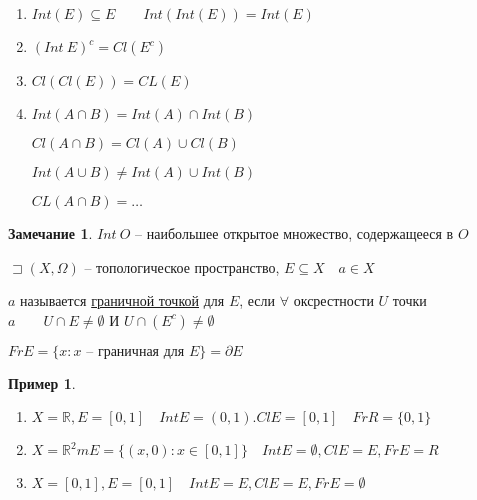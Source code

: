 \documentclass{book}
\newcommand\R{\ensuremath{\mathbb{R}}}
\renewcommand\O{\ensuremath{\emptyset}}
\theoremstyle{definition}
\newtheorem*{note}{Замечание}
\newtheorem*{example}{Пример}
\begin{document}
\begin{problem}
    \begin{enumerate}
        \item $Int(E)\subseteq E\qquad Int(Int(E)) = Int(E)$
        \item $(Int~E)^c = Cl(E^c)$
        \item  $Cl(Cl(E)) = CL(E)$
        \item  $Int(A\cap B) = Int(A)\cap Int(B)$
        
            $Cl(A\cap B) = Cl(A)\cup Cl(B)$ 
            
            $Int(A\cup B)\neq Int(A) \cup Int(B)$ 

            $CL(A\cap B) = \ldots$
    \end{enumerate}
\end{problem}

\begin{note}
    $Int~O$ -- наибольшее открытое множество, содержащееся в  $O$
\end{note}

\begin{definition}
    $\sqsupset (X, \Omega)$ -- топологическое пространство, $E\subseteq X\quad a\in X$

    $a$ называется \underline{граничной точкой} для  $E$, если  $\forall $ оксрестности $U$ точки  $a\qquad U\cap E\neq \O $ И $U\cap (E^c)\neq \O $

    $Fr E = \{x: x\text{ -- граничная для } E\} = \partial E$
\end{definition}

\begin{example}
    \begin{enumerate}
        \item $X = \R, E = [0,1]\quad Int E = (0,1). Cl E = [0,1]\quad FrR = \{0, 1\}$
        \item $X = \R^2m E = \{(x,0): x\in [0,1]\}\quad Int E = \O , ClE = E, FrE = R$
        \item $ X = [0,1], E = [0,1]\quad Int E = E, ClE = E, Fr E = \O $
    \end{enumerate}
\end{example}
\end{document}
